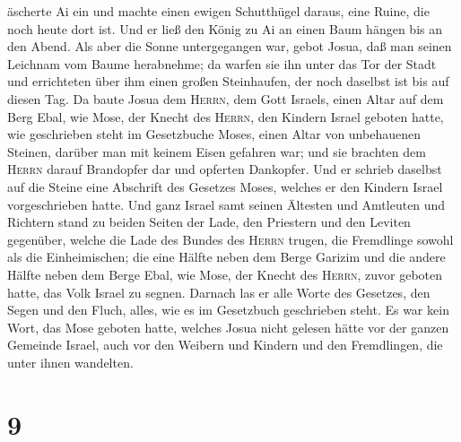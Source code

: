 äscherte Ai ein und machte einen ewigen Schutthügel daraus, eine Ruine,
die noch heute dort ist.  Und er ließ den König zu Ai an
einen Baum hängen bis an den Abend. Als aber die Sonne untergegangen
war, gebot Josua, daß man seinen Leichnam vom Baume herabnehme; da
warfen sie ihn unter das Tor der Stadt und errichteten über ihm einen
großen Steinhaufen, der noch daselbst ist bis auf diesen Tag.
 Da baute Josua dem \textsc{Herrn}, dem Gott Israels,
einen Altar auf dem Berg Ebal,  wie Mose, der Knecht des
\textsc{Herrn}, den Kindern Israel geboten hatte, wie geschrieben steht
im Gesetzbuche Moses, einen Altar von unbehauenen Steinen, darüber man
mit keinem Eisen gefahren war; und sie brachten dem \textsc{Herrn}
darauf Brandopfer dar und opferten Dankopfer.  Und er
schrieb daselbst auf die Steine eine Abschrift des Gesetzes Moses,
welches er den Kindern Israel vorgeschrieben hatte.  Und
ganz Israel samt seinen Ältesten und Amtleuten und Richtern stand zu
beiden Seiten der Lade, den Priestern und den Leviten gegenüber, welche
die Lade des Bundes des \textsc{Herrn} trugen, die Fremdlinge sowohl als
die Einheimischen; die eine Hälfte neben dem Berge Garizim und die
andere Hälfte neben dem Berge Ebal, wie Mose, der Knecht des
\textsc{Herrn}, zuvor geboten hatte, das Volk Israel zu segnen.
 Darnach las er alle Worte des Gesetzes, den Segen und
den Fluch, alles, wie es im Gesetzbuch geschrieben steht.
 Es war kein Wort, das Mose geboten hatte, welches Josua
nicht gelesen hätte vor der ganzen Gemeinde Israel, auch vor den Weibern
und Kindern und den Fremdlingen, die unter ihnen wandelten.

\hypertarget{section-8}{%
\section{9}\label{section-8}}

